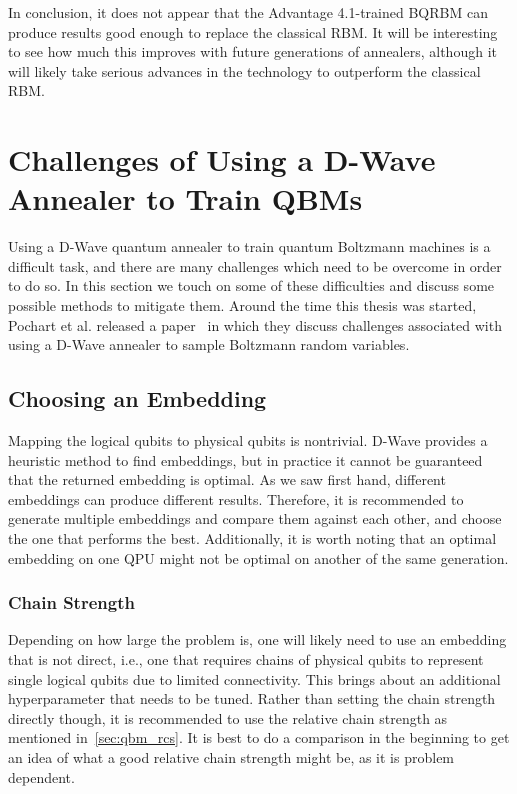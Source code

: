 In conclusion, it does not appear that the Advantage 4.1-trained BQRBM can produce results good enough to replace the classical RBM.
It will be interesting to see how much this improves with future generations of annealers, although it will likely take serious advances in the technology to outperform the classical RBM.

\clearpage
\section{Challenges of Using a D-Wave Annealer to Train QBMs}\label{sec:challenges}
Using a D-Wave quantum annealer to train quantum Boltzmann machines is a difficult task, and there are many challenges which need to be overcome in order to do so.
In this section we touch on some of these difficulties and discuss some possible methods to mitigate them.
Around the time this thesis was started, Pochart et al. released a paper~\cite{pochart_2021} in which they discuss challenges associated with using a D-Wave annealer to sample Boltzmann random variables.

\subsection{Choosing an Embedding}
Mapping the logical qubits to physical qubits is nontrivial.
D-Wave provides a heuristic method to find embeddings, but in practice it cannot be guaranteed that the returned embedding is optimal.
As we saw first hand, different embeddings can produce different results.
Therefore, it is recommended to generate multiple embeddings and compare them against each other, and choose the one that performs the best.
Additionally, it is worth noting that an optimal embedding on one QPU might not be optimal on another of the same generation.

\subsubsection{Chain Strength}
Depending on how large the problem is, one will likely need to use an embedding that is not direct, i.e., one that requires chains of physical qubits to represent single logical qubits due to limited connectivity.
This brings about an additional hyperparameter that needs to be tuned.
Rather than setting the chain strength directly though, it is recommended to use the relative chain strength as mentioned in~\cref{sec:qbm_rcs}.
It is best to do a comparison in the beginning to get an idea of what a good relative chain strength might be, as it is problem dependent.

